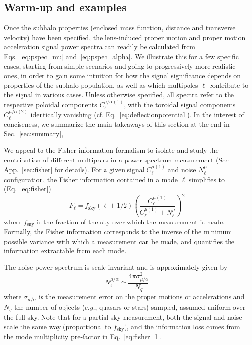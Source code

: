 \documentclass[prd,aps,10pt,nofootinbib,twocolumn,superscriptaddress,preprintnumbers,balancelastpage,longbibliography]{revtex4-1}
\begin{document}
\subsection{Warm-up and examples}
\label{sec:examples}

Once the subhalo properties (enclosed mass function, distance and transverse velocity) have been specified, the lens-induced proper motion and proper motion acceleration signal power spectra can readily be calculated from Eqs.~\ref{eq:pspec_mu} and~\ref{eq:pspec_alpha}. We illustrate this for a few specific cases, starting from simple scenarios and going to progressively more realistic ones, in order to gain some intuition for how the signal significance depends on properties of the subhalo population, as well as which multipoles $\ell$ contribute to the signal in various cases. Unless otherwise specified, all spectra refer to the respective poloidal components $C_{\ell}^{\mu/\alpha (1)}$, with the toroidal signal components $C_{\ell}^{\mu/\alpha (2)}$ identically vanishing (cf. Eq.~\ref{eq:deflectionpotential}). In the interest of conciseness, we summarize the main takeaways of this section at the end in Sec.~\ref{sec:summary},

We appeal to the Fisher information formalism to isolate and study the contribution of different multipoles in a power spectrum measurement (See App.~\ref{sec:fisher} for details). For a given signal $C_{\ell}^{\mu (1)}$ and noise $N_{\ell}^{\mu}$ configuration, the Fisher information contained in a mode $\ell$ simplifies to (Eq.~\ref{eq:fisher}) 
\begin{equation}
F_\ell = f_\mathrm{sky}(\ell + 1/2) \left(\frac{C_{\ell}^{\mu (1)}}{C_{\ell}^{\mu (1)} + N_{\ell}^{\mu}}\right)^2
\label{eq:fisher_l}
\end{equation}
where $f_\mathrm{sky}$ is the fraction of the sky over which the measurement is made. Formally, the Fisher information corresponds to the inverse of the minimum possible variance with which a measurement can be made, and quantifies the information extractable from each mode.

The noise power spectrum is scale-invariant and is approximately given by
\begin{equation}
N_{\ell}^{\mu/\alpha} \simeq \frac{4\pi\sigma_{\mu/\alpha}^2}{N_q}
\end{equation}
where $\sigma_{\mu/\alpha}$ is the measurement error on the proper motions or accelerations and $N_q$ the number of objects (\emph{e.g.}, quasars or stars) sampled, assumed uniform over the full sky. Note that for a partial-sky measurement, both the signal and noise scale the same way (proportional to $f_\mathrm{sky}$), and the information loss comes from the mode multiplicity pre-factor in Eq.~\ref{eq:fisher_l}.
\end{document}
